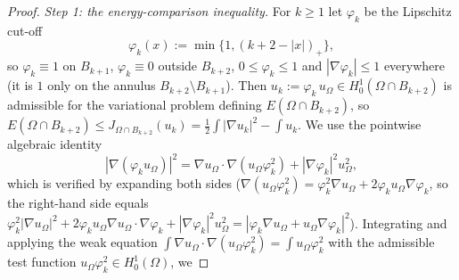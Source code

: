 \documentclass[11pt]{amsart}
\theoremstyle{definition}
\newcommand{\Om}{\Omega}
\newcommand{\abs}[1]{\left|#1\right|}
\begin{document}
\begin{proof}
\smallskip
\emph{Step 1: the energy-comparison inequality.}
For $k\ge1$ let $\varphi_k$ be the Lipschitz cut-off
\[
   \varphi_k(x):=\min\bigl\{1,(k+2-\abs{x})_+\bigr\},
\]
so $\varphi_k\equiv1$ on $B_{k+1}$, $\varphi_k\equiv0$ outside $B_{k+2}$,
$0\le\varphi_k\le1$ and $\abs{\nabla\varphi_k}\le1$ everywhere (it is
$1$ only on the annulus $B_{k+2}\setminus B_{k+1}$).
Then
$u_k:=\varphi_k\,u_\Om\in H^1_0(\Om\cap B_{k+2})$ is admissible for the
variational problem defining $E(\Om\cap B_{k+2})$, so
$E(\Om\cap B_{k+2})\le J_{\Om\cap B_{k+2}}(u_k)
=\tfrac12\int\abs{\nabla u_k}^2-\int u_k$.
We use the pointwise algebraic
identity
\[
   \abs{\nabla(\varphi_k u_\Om)}^2
   =\nabla u_\Om\cdot\nabla(u_\Om\varphi_k^2)
   +\abs{\nabla\varphi_k}^2u_\Om^2,
\]
which is verified by expanding both sides
($\nabla(u_\Om\varphi_k^2)=\varphi_k^2\nabla u_\Om
+2\varphi_k u_\Om\nabla\varphi_k$, so the right-hand side equals
$\varphi_k^2\abs{\nabla u_\Om}^2+2\varphi_k u_\Om\nabla u_\Om\cdot
\nabla\varphi_k+\abs{\nabla\varphi_k}^2 u_\Om^2
=\abs{\varphi_k\nabla u_\Om+u_\Om\nabla\varphi_k}^2$).
Integrating and
applying the weak equation
$\int\nabla u_\Om\cdot\nabla(u_\Om\varphi_k^2)=\int u_\Om\varphi_k^2$
with the admissible test function $u_\Om\varphi_k^2\in H^1_0(\Om)$, we

\end{proof}
\end{document}
